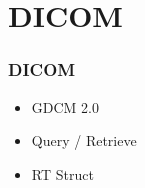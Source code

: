 \section{DICOM}




{
\begin{frame}
\frametitle{DICOM}
\Huge
\begin{itemize}
\item GDCM 2.0
\pause
\item Query / Retrieve
\pause
\item RT Struct
\end{itemize}
\end{frame}
}


